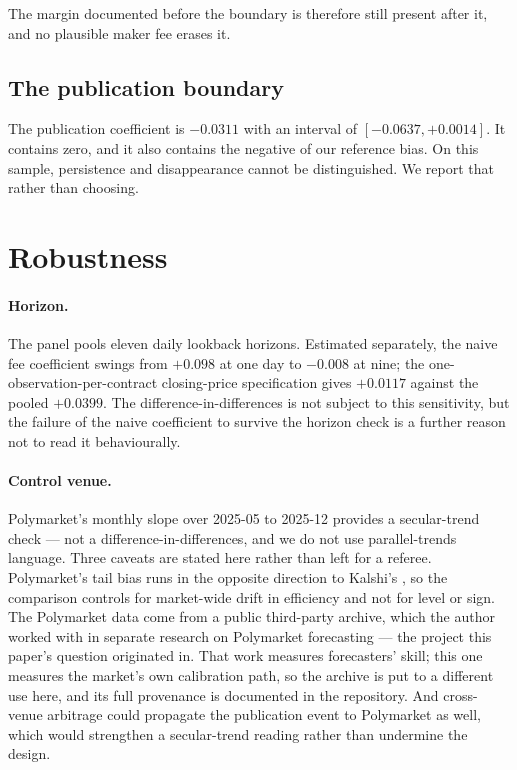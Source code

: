 \documentclass[preprint,12pt,authoryear]{elsarticle}
\begin{document}
The margin documented before the boundary is therefore still present after it,
and no plausible maker fee erases it.

\subsection{The publication boundary}

The publication coefficient is $-0.0311$ with an interval of $[-0.0637,
+0.0014]$. It contains zero, and it also contains the negative of our reference
bias. On this sample, persistence and disappearance cannot be distinguished. We
report that rather than choosing.

\section{Robustness}\label{sec:robustness}

\paragraph{Horizon.} The panel pools eleven daily lookback horizons. Estimated
separately, the naive fee coefficient swings from $+0.098$ at one day to
$-0.008$ at nine; the one-observation-per-contract closing-price specification
gives $+0.0117$ against the pooled $+0.0399$. The difference-in-differences is
not subject to this sensitivity, but the failure of the naive coefficient to
survive the horizon check is a further reason not to read it behaviourally.

\paragraph{Control venue.} Polymarket's monthly slope over 2025-05 to 2025-12
provides a secular-trend check --- not a difference-in-differences, and we do
not use parallel-trends language. Three caveats are stated here rather than left
for a referee. Polymarket's tail bias runs in the opposite direction to Kalshi's
\citep{qin2026}, so the comparison controls for market-wide drift in efficiency
and not for level or sign. The Polymarket data come from a public third-party
archive, which the author worked with in separate research on Polymarket
forecasting --- the project this paper's question originated in. That work
measures forecasters' skill; this one measures the market's own calibration
path, so the archive is put to a different use here, and its full provenance is
documented in the repository.
And cross-venue arbitrage could propagate the publication event to Polymarket as
well, which would strengthen a secular-trend reading rather than undermine the
design.
\end{document}
